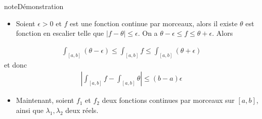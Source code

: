 \documentclass[letterpaper,10pt,french]{sphinxmanual}
\begin{document}
\begin{sphinxadmonition}{note}{Démonstration}
\begin{itemize}
\item {} 
\sphinxAtStartPar
Soient \(\epsilon>0\) et \(f\) est une fonction continue par morceaux, alors il existe \(\theta\) est fonction en escalier telle que \(|f-\theta|\leq \epsilon\). On a \(\theta - \epsilon \leq f \leq \theta + \epsilon\). Alors

\end{itemize}
\begin{equation*}
\begin{split}
 \int_{[a, b]} (\theta - \epsilon) \leq  \int_{[a, b]} f \leq  \int_{[a, b]} (\theta + \epsilon)
 \end{split}
\end{equation*}
\sphinxAtStartPar
et donc
\begin{equation*}
\begin{split}
\left|\int_{[a, b]} f- \int_{[a, b]} \theta \right| \leq (b-a)\epsilon
\end{split}
\end{equation*}\begin{itemize}
\item {} 
\sphinxAtStartPar
Maintenant, soient \(f_1\) et \(f_2\) deux fonctions continues par morceaux sur \([a, b]\), ainsi que \(\lambda_1, \lambda_2\) deux réels.

\end{itemize}


\end{sphinxadmonition}
\end{document}
